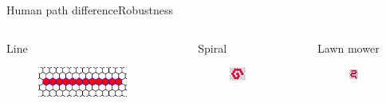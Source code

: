 \begin{frame}{Human path difference}{Robustness}

\begin{columns}[T]
\begin{block}{Line}
\begin{minipage}[c][.2\textheight][c]{\linewidth}
\begin{figure}
\centering
\includegraphics[width = 0.8\textwidth]{./figure/HMP_Line_Small.png}
\end{figure}
\end{minipage}
\end{block}

\begin{block}{Spiral}
\begin{minipage}[c][.2\textheight][c]{\linewidth}
\begin{figure}
\centering
\includegraphics[width = 0.4\textwidth]{./figure/HMP_Spiral_Small.png}
\end{figure}
\end{minipage}
\end{block}

\begin{block}{Lawn mower}
\begin{minipage}[c][.2\textheight][c]{\linewidth}
\begin{figure}
\centering
\includegraphics[width = 0.33\textwidth]{./figure/HMP_LawnMower_Small.png}
\end{figure}
\end{minipage}
\end{block}
\end{columns}


\end{frame}

